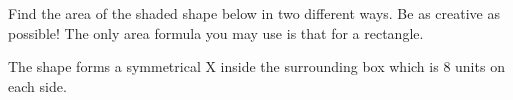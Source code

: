 \documentclass[noauthor,nooutcomes, handout]{ximera}
\begin{document}
\begin{problem}
Find the area of the shaded shape below in two different ways.  Be as creative as possible!  The only area formula you may use is that for a rectangle.

The shape forms a symmetrical X inside the surrounding box which is $8$ units on each side.

\begin{center}
\end{center}
\end{problem} \vfill



\newpage
\end{document}
